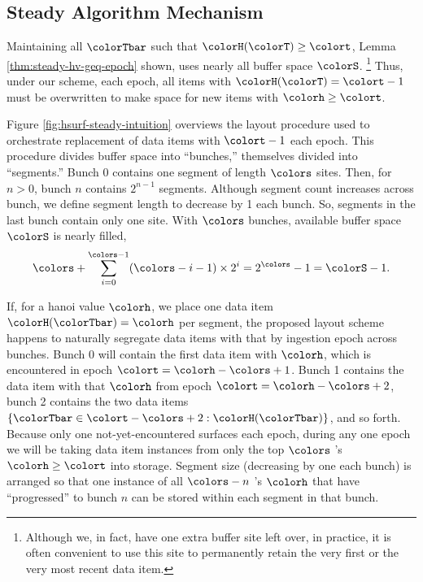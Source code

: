 

\subsection{Steady Algorithm Mechanism}
\label{sec:steady-mechanism}



Maintaining all $\colorTbar$ such that $\colorH(\colorT) \geq \colort$, Lemma \ref{thm:steady-hv-geq-epoch} shown, uses nearly all buffer space $\colorS$.%
\footnote{%
Although we, in fact, have one extra buffer site left over, in practice, it is often convenient to use this site to permanently retain the very first or the very most recent data item.%
}
Thus, under our scheme, each epoch, all items with $\colorH(\colorT) = \colort - 1$ must be overwritten to make space for new items with \hv{} $\colorh \geq \colort$.

Figure \ref{fig:hsurf-steady-intuition} overviews the layout procedure used to orchestrate replacement of data items with \hv{} $\colort - 1$ each epoch.
This procedure divides buffer space into ``bunches,'' themselves divided into ``segments.''
Bunch 0 contains one segment of length $\colors$ sites.
Then, for $n > 0$, bunch $n$ contains $2^{n-1}$ segments.
Although segment count increases across bunch, we define segment length to decrease by 1 each bunch.
So, segments in the last bunch contain only one site.
With $\colors$ bunches, available buffer space $\colorS$ is nearly filled,
\begin{align*}
\colors + \sum_{i=0}^{\colors-1} (\colors - i - 1) \times 2^{i} = 2^{\colors} - 1 = \colorS - 1.
\end{align*}

If, for a hanoi value $\colorh$, we place one data item $\colorH(\colorTbar) = \colorh$ per segment, the proposed layout scheme happens to naturally segregate data items with that \hv{} by ingestion epoch across bunches.
Bunch 0 will contain the first data item with \hv{} $\colorh$, which is encountered in epoch $\colort=\colorh - \colors + 1$.
Bunch 1 contains the data item with that \hv{} $\colorh$ from epoch $\colort=\colorh - \colors + 2$, bunch 2 contains the two data items $\{ \colorTbar \in \colort - \colors + 2 : \colorH(\colorTbar) \}$, and so forth.
Because only one not-yet-encountered \hv{} surfaces each epoch, during any one epoch we will be taking data item instances from only the top $\colors$ \hv{}'s $\colorh \geq \colort$ into storage.
Segment size (decreasing by one each bunch) is arranged so that one instance of all $\colors - n$ \hv{}'s $\colorh$ that have ``progressed'' to bunch $n$ can be stored within each segment in that bunch.

